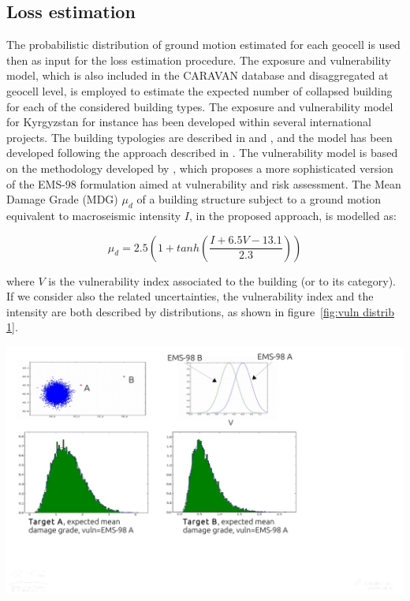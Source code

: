 \documentclass[12p]{article}
\begin{document}
\subsection{Loss estimation}
\label{sec:impact comp/loss}

The probabilistic distribution of ground motion estimated for each geocell is
used then as input for the loss estimation procedure. The exposure and
vulnerability model, which is also included in the CARAVAN database and
disaggregated at geocell level, is employed to estimate the expected number of
collapsed building for each of the considered building types. The exposure and
vulnerability model for Kyrgyzstan for instance has been developed within
several international projects. The building typologies are described in
\cite{wieland_towards_2015} and \cite{wieland_multiscale_2015}, and the model
has been developed following the approach described in
\cite{pittore_toward_2013}.
The vulnerability model is based on the methodology developed by
\cite{giovinazzi_method_2002}, which proposes a more sophisticated version of
the EMS-98 formulation aimed at vulnerability and risk assessment.
The Mean Damage Grade (MDG) $\mu_d$ of a building structure subject to a ground
motion equivalent to macroseismic intensity $I$, in the proposed approach, is
modelled as:

\begin{equation}
\mu_d=2.5\left(1+tanh(\frac{I+6.5 V-13.1}{2.3})\right)
\end{equation}

where $V$ is the vulnerability index associated to the building (or to its
category). If we consider also the related uncertainties, the vulnerability
index and the intensity are both described by distributions, as shown in
figure~\ref{fig:vuln distrib 1}. 

\begin{center}
	\includegraphics[trim=0mm 30mm 0mm 0mm,clip,
width=\textwidth]{vuln_distrib_01}
\end{center}
\end{document}
